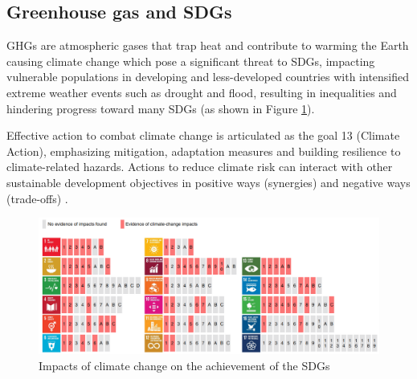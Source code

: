 \subsection{Greenhouse gas and SDGs}
GHGs are atmospheric gases that trap heat and contribute to warming the Earth causing climate change which pose a significant threat to SDGs, impacting vulnerable populations in developing and less-developed countries with intensified extreme weather events such as drought and flood, resulting in inequalities and hindering progress toward many SDGs (as shown in Figure \ref{fig:chap2_fig5}). \par
Effective action to combat climate change is articulated as the goal 13 (Climate Action), emphasizing mitigation, adaptation measures and building resilience to climate-related hazards. Actions to reduce climate risk can interact with other sustainable development objectives in positive ways (synergies) and negative ways (trade-offs) \citep{lee2023climate}. \par
\begin{figure}[tbh!]
    \centering
    \includegraphics[width=\textwidth]{figs/chap2/impact_cc_to_sdgs.png}
    \caption{Impacts of climate change on the achievement of the SDGs \citep{fuso2019connecting}}
    \label{fig:chap2_fig5}
\end{figure}

